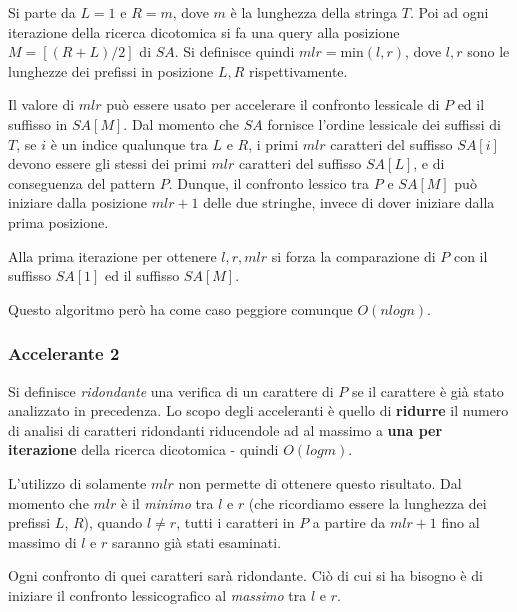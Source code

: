 Si parte da $L = 1$ e $R = m$, dove $m$ è la lunghezza della stringa $T$. Poi ad ogni iterazione della ricerca dicotomica si fa una query alla posizione $M = [(R + L)/2]$ di $SA$.
Si definisce quindi $mlr = \text{min}(l, r)$, dove $l, r$ sono le lunghezze dei prefissi in posizione $L, R$ rispettivamente.

Il valore di $mlr$ può essere usato per accelerare il confronto lessicale di $P$ ed il suffisso in $SA[M]$. Dal momento che $SA$ fornisce l'ordine lessicale dei suffissi di $T$, se $i$ è un indice qualunque tra $L$ e $R$, i primi $mlr$ caratteri del suffisso $SA[i]$ devono essere gli stessi dei primi $mlr$ caratteri del suffisso $SA[L]$, e di conseguenza del pattern $P$. Dunque, il confronto lessico tra $P$ e $SA[M]$ può iniziare dalla posizione $mlr + 1$ delle due stringhe, invece di dover iniziare dalla prima posizione.

Alla prima iterazione per ottenere $l, r, mlr$ si forza la comparazione di $P$ con il suffisso $SA[1]$ ed il suffisso $SA[M]$.

Questo algoritmo però ha come caso peggiore comunque $O(nlogn)$.

\subsubsection{Accelerante 2}

Si definisce \textit{ridondante} una verifica di un carattere di $P$ se il carattere è già stato analizzato in precedenza. Lo scopo degli acceleranti è quello di \textbf{ridurre} il numero di analisi di caratteri ridondanti riducendole ad al massimo a \textbf{una per iterazione} della ricerca dicotomica - quindi $O(logm)$. 

L'utilizzo di solamente $mlr$ non permette di ottenere questo risultato. Dal momento che $mlr$ è il \textit{minimo} tra $l$ e $r$ (che ricordiamo essere la lunghezza dei prefissi $L$, $R$), quando $l \neq r$, tutti i caratteri in $P$ a partire da $mlr + 1$ fino al massimo di $l$ e $r$ saranno già stati esaminati. 

Ogni confronto di quei caratteri sarà ridondante. Ciò di cui si ha bisogno è di iniziare il confronto lessicografico al \textit{massimo} tra $l$ e $r$.

